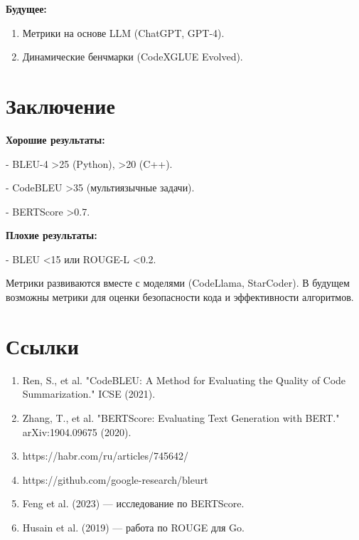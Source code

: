 \textbf{Будущее:}
\begin{enumerate}
    \item Метрики на основе LLM (ChatGPT, GPT-4).
    \item Динамические бенчмарки (CodeXGLUE Evolved).
\end{enumerate}

\section*{Заключение}

\textbf{Хорошие результаты:}

    
- BLEU-4 >25 (Python), >20 (C++).
    
- CodeBLEU >35 (мультиязычные задачи).
    
- BERTScore >0.7.


\textbf{Плохие результаты:}

    
- BLEU <15 или ROUGE-L <0.2.


Метрики развиваются вместе с моделями (CodeLlama, StarCoder). В будущем возможны метрики для оценки безопасности кода и эффективности алгоритмов.

\section*{Ссылки}
\begin{enumerate}
    \item Ren, S., et al. "CodeBLEU: A Method for Evaluating the Quality of Code Summarization." ICSE (2021).
    \item Zhang, T., et al. "BERTScore: Evaluating Text Generation with BERT." arXiv:1904.09675 (2020).
    \item https://habr.com/ru/articles/745642/
    \item https://github.com/google-research/bleurt
    \item Feng et al. (2023) — исследование по BERTScore.
    \item Husain et al. (2019) — работа по ROUGE для Go.
\end{enumerate}
